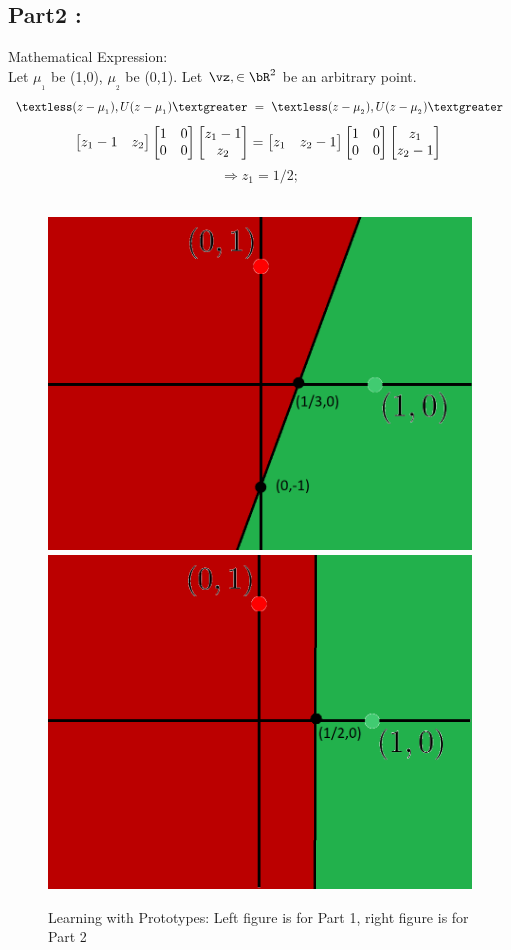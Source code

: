 \documentclass[a4paper,11pt]{article}
\begin{document}
\begin{mlsolution}
\subsection*{Part2 :}
Mathematical Expression: \\
Let $\mu_{_{1}}$ be (1,0), $\mu_{_{2}}$ be (0,1). Let $\vz, \in \bR^2$ be an arbitrary point.  
\begin{equation}
    \textless(z-\mu_{_{1}} ), U(z-\mu_{_{1}})\textgreater  \ = \  \textless(z-\mu_{_{2}} ), U(z-\mu_{_{2}})\textgreater
\end{equation}
\begin{equation}
    \begin{bmatrix}
    z_{1}-1 & z_{2}
\end{bmatrix}
 \begin{bmatrix}
    1 & 0 \\
    0 & 0 
\end{bmatrix}
 \begin{bmatrix}
   z_{1}-1  \\
    z_{2}
\end{bmatrix}
=
    \begin{bmatrix}
    z_{1} & z_{2}-1
\end{bmatrix}
 \begin{bmatrix}
    1 & 0 \\
    0 & 0 
\end{bmatrix}
 \begin{bmatrix}
   z_{1}  \\
    z_{2}-1
\end{bmatrix} \\
\end{equation}
\begin{equation}
    \Rightarrow z_{1} = 1/2;
\end{equation} \\
\begin{figure}[th]%
\centering
\includegraphics[width=0.3\columnwidth]{Part1.png}%
\hfill
\includegraphics[width=0.3\columnwidth]{Part2.png}%
\caption{Learning with Prototypes: Left figure is for Part 1, right figure is for Part 2}%
\label{fig:proto}%
\end{figure}

\end{mlsolution}
\end{document}

